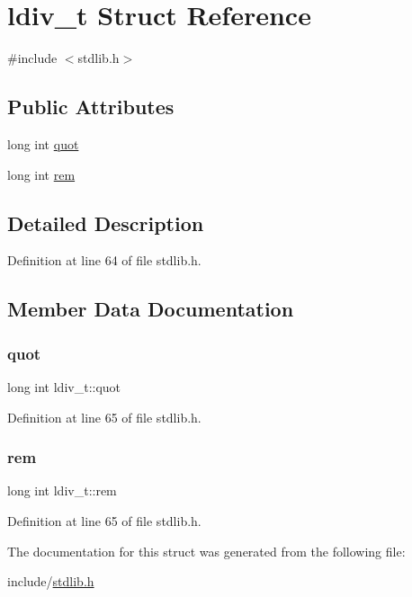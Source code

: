 \hypertarget{structldiv__t}{}\section{ldiv\+\_\+t Struct Reference}
\label{structldiv__t}


{\ttfamily \#include $<$stdlib.\+h$>$}

\subsection*{Public Attributes}
\begin{DoxyCompactItemize}
\item 
long int \mbox{\hyperlink{structldiv__t_ac56cf5939abb521a3a0c48f422b72271}{quot}}
\item 
long int \mbox{\hyperlink{structldiv__t_a66737a893b8872671393a49aaf568cb1}{rem}}
\end{DoxyCompactItemize}


\subsection{Detailed Description}


Definition at line 64 of file stdlib.\+h.



\subsection{Member Data Documentation}
\mbox{\label{structldiv__t_ac56cf5939abb521a3a0c48f422b72271}} 
\subsubsection{\texorpdfstring{quot}{quot}}
{\footnotesize\ttfamily long int ldiv\+\_\+t\+::quot}



Definition at line 65 of file stdlib.\+h.

\mbox{\label{structldiv__t_a66737a893b8872671393a49aaf568cb1}} 
\subsubsection{\texorpdfstring{rem}{rem}}
{\footnotesize\ttfamily long int ldiv\+\_\+t\+::rem}



Definition at line 65 of file stdlib.\+h.



The documentation for this struct was generated from the following file\+:\begin{DoxyCompactItemize}
\item 
include/\mbox{\hyperlink{stdlib_8h}{stdlib.\+h}}\end{DoxyCompactItemize}
